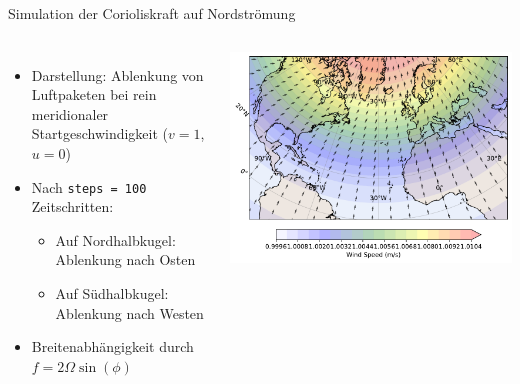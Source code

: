\begin{frame}{Simulation der Corioliskraft auf Nordströmung}
	\begin{columns}
		\begin{itemize}
			\item Darstellung: Ablenkung von Luftpaketen bei rein meridionaler Startgeschwindigkeit (\(v = 1\), \(u = 0\))
			\item Nach \texttt{steps = 100} Zeitschritten:
			      \begin{itemize}
				      \item Auf Nordhalbkugel: Ablenkung nach Osten
				      \item Auf Südhalbkugel: Ablenkung nach Westen
			      \end{itemize}
			\item Breitenabhängigkeit durch \(f = 2 \Omega \sin(\phi)\)
		\end{itemize}

		\includegraphics[width=\linewidth]{../images/coriolis_effect_plot.pdf}
	\end{columns}
\end{frame}


